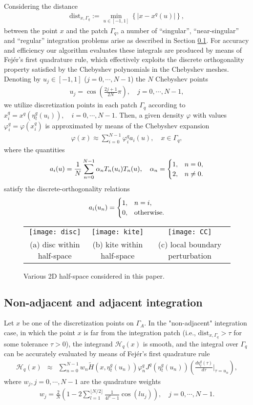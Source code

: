 \documentclass[10pt]{article}
\numberwithin{equation}{section}
\newcommand{\be}{\begin{eqnarray}}
\newcommand{\ben}{\begin{eqnarray*}}
\newcommand{\en}{\end{eqnarray}}
\newcommand{\enn}{\end{eqnarray*}}
\begin{document}
Considering the distance \ben
\mbox{dist}_{x,\Gamma_q}:=\min_{u\in[-1,1]} \left\{|x-x^q(u)|
\right\}, \enn between the point $x$ and the patch $\Gamma_q$, a
number of ``singular'', ``near-singular'' and ``regular'' integration
problems arise as described in Section \ref{sec:4.3}. For accuracy and
efficiency our algorithm evaluates these integrals are produced by
means of Fej\'er's first quadrature rule, which effectively exploits
the discrete orthogonality property satisfied by the Chebyshev
polynomials in the Chebyshev meshes. Denoting by $u_j\in [-1,1]$
($j=0,\cdots,N-1$) the $N$ Chebyshev points \ben
u_j=\cos\left(\frac{2j+1}{2N}\pi\right),\quad j=0,\cdots,N-1, \enn we
utilize discretization points in each patch $\Gamma_q$ according to
$x_i^q=x^q(\eta_t^q(u_i)),\quad i=0,\cdots,N-1$. Then, a given density
$\varphi$ with values $\varphi_i^q = \varphi(x_i^q)$ is approximated
by means of the Chebyshev expansion \ben \varphi(x)\approx
\sum_{i=0}^{N-1} \varphi_i^q a_i(u),\quad x\in\Gamma_q, \enn where
the quantities
\ben a_i(u)= \frac{1}{N}\sum_{n=0}^{N-1}\alpha_n T_n(u_i)T_n(u),\quad
\alpha_n=\begin{cases} 1, & n=0,\cr 2, & n\ne 0.
\end{cases}
\enn satisfy the discrete-orthogonality relations \ben
a_i(u_n)=\begin{cases} 1, & n=i,\cr 0, & \mathrm{otherwise}.
\end{cases}
\enn
\begin{figure}[htbp]
\centering
\begin{tabular}{ccc}
\texttt{[image: disc]} &
\texttt{[image: kite]} &
\texttt{[image: CC]} \\
(a) disc within half-space & (b) kite within half-space& (c) local boundary perturbation\\
\end{tabular}
\caption{Various 2D half-space considered in this paper.}
\label{Figure2D.1}
\end{figure}



\subsection{Non-adjacent and adjacent integration}
\label{sec:4.3}

Let $x$ be one of the discretization points on $\Gamma_A$. In the
"non-adjacent" integration case, in which the point $x$ is far from
the integration patch (i.e., $\mbox{dist}_{x,\Gamma_q}> \tau$ for some
tolerance $\tau>0$), the integrand $\mathcal{H}_q(x)$ is smooth, and
the integral over $\Gamma_q$ can be accurately evaluated by means of
Fej\'er's first quadrature rule \be
\label{nonadjencent}
\mathcal{H}_q(x) &\approx& \sum_{n=0}^{N-1}
w_n\widetilde{H}(x,\eta_t^q(u_n)) \varphi_{n}^q
J^q(\eta_t^q(u_n))\left(\frac{d\eta_t^q(\tau)}{d\tau}\Big|_{\tau=u_n}\right), \en where $w_j,j=0,\cdots,N-1$ are the quadrature weights \ben
w_j=\frac{2}{N}\left(1-2\sum_{l=1}^{\lfloor N/2\rfloor}
  \frac{1}{4l^2-1}\cos(lu_j)\right),\quad j=0,\cdots,N-1.  \enn
\end{document}
